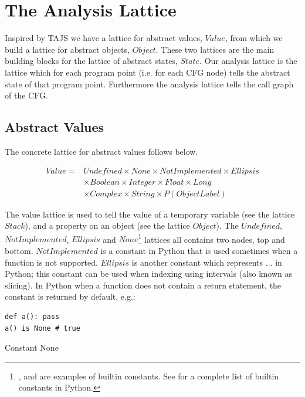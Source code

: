 \chapter{The Analysis Lattice}
Inspired by TAJS \cite{tajs} we have a lattice for abstract values, $Value$, from which we build a lattice for abstract objects, $Object$. These two lattices are the main building blocks for the lattice of abstract states, $State$. Our analysis lattice is the lattice which for each program point (i.e. for each CFG node) tells the abstract state of that program point. Furthermore the analysis lattice tells the call graph of the CFG.

\section{Abstract Values}
The concrete lattice for abstract values follows below.

\begin{eqnarray*}
Value = & Undefined \times None \times NotImplemented \times Ellipsis \\
        & \times Boolean \times Integer \times Float \times Long \\
        & \times Complex \times String \times P(ObjectLabel)
\end{eqnarray*}

The value lattice is used to tell the value of a temporary variable (see the lattice $Stack$), and a property on an object (see the lattice $Object$). The $Undefined$, $NotImplemented$, $Ellipsis$ and $None$\footnote{,  and  are examples of builtin constants. See \cite{pyref.constants} for a complete list of builtin constants in Python.} lattices all contains two nodes, top and bottom. $NotImplemented$ is a constant in Python that is used sometimes when a function is not supported. $Ellipsis$ is another constant which represents $\dots$ in Python; this constant can be used when indexing using intervals (also known as slicing). In Python when a function does not contain a return statement, the constant  is returned by default, e.g.:

\begin{listing}[H]
	\begin{verbatim}
def a(): pass
a() is None # true
	\end{verbatim}
	\caption{Constant None}\label{code:NoneExample}
\end{listing}

